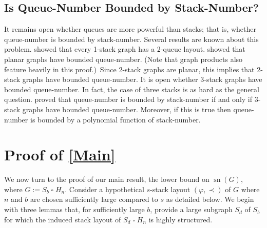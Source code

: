 \documentclass[kpfonts]{patmorin}
\DeclareMathOperator{\sn}{sn}
\newcommand{\CartProd}{\mathbin{\square}}
\begin{document}



\subsection*{Is Queue-Number Bounded by Stack-Number? }

It remains open whether queues are more powerful than stacks; that is, whether queue-number is bounded by stack-number. Several results are known about this problem. \citet{HLR92} showed that every 1-stack graph has a 2-queue layout. \citet{DJMMUW20} showed that planar graphs have bounded queue-number. (Note that graph products also feature heavily in this proof.)\ Since 2-stack graphs are planar, this implies that 2-stack graphs have bounded queue-number. It is open whether 3-stack graphs have bounded queue-number. In fact, the case of three stacks is as hard as the general question. \citet{DujWoo05} proved that queue-number is bounded by stack-number if and only if 3-stack graphs have bounded queue-number. Moreover, if this is true then queue-number is bounded by a polynomial function of stack-number.



\section{Proof of \cref{Main}}

We now turn to the proof of our main result, the lower bound on $\sn(G)$, where $G:= S_b\CartProd H_n$. Consider a hypothetical $s$-stack layout $(\varphi,\prec)$ of $G$ where $n$ and $b$ are chosen sufficiently large compared to $s$ as detailed below. We begin with three lemmas that, for sufficiently large $b$, provide a large subgraph $S_d$ of $S_b$ for which the induced stack layout of $S_d\CartProd H_n$ is highly structured.
\end{document}
